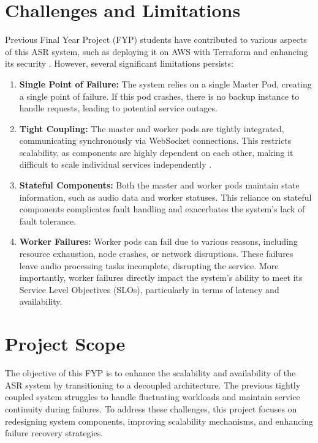 \section{Challenges and Limitations}\label{section:challenges}
Previous Final Year Project (FYP) students have contributed to various aspects of this ASR system, such as deploying it on AWS with Terraform \cite{song_yu, kai_shern} and enhancing its security \cite{putra}. However, several significant limitations persists:
\begin{enumerate}
    \item \textbf{Single Point of Failure:} The system relies on a single Master Pod, creating a single point of failure. If this pod crashes, there is no backup instance to handle requests, leading to potential service outages.
    \item \textbf{Tight Coupling:} The master and worker pods are tightly integrated, communicating synchronously via WebSocket connections. This restricts scalability, as components are highly dependent on each other, making it difficult to scale individual services independently \cite{tight_couple}.
    \item \textbf{Stateful Components:} Both the master and worker pods maintain state information, such as audio data and worker statuses. This reliance on stateful components complicates fault handling and exacerbates the system's lack of fault tolerance.
    \item \textbf{Worker Failures:} Worker pods can fail due to various reasons, including resource exhaustion, node crashes, or network disruptions. These failures leave audio processing tasks incomplete, disrupting the service. More importantly, worker failures directly impact the system’s ability to meet its Service Level Objectives (SLOs), particularly in terms of latency and availability.
    
\end{enumerate}

\section{Project Scope}
The objective of this FYP is to enhance the scalability and availability of the ASR system by transitioning to a decoupled architecture. The previous tightly coupled system struggles to handle fluctuating workloads and maintain service continuity during failures. To address these challenges, this project focuses on redesigning system components, improving scalability mechanisms, and enhancing failure recovery strategies.

